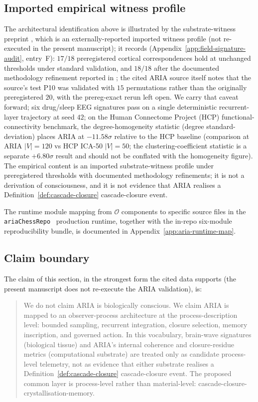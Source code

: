 \documentclass[11pt]{article}
\theoremstyle{definition}
\newcommand{\Ocal}{\mathcal{O}}
\begin{document}
\subsection{Imported empirical witness profile}

The architectural identification above is illustrated by the
substrate-witness preprint \cite{SmartARIAChess}, which is an
externally-reported imported witness profile (not re-executed in the
present manuscript); it records
(Appendix~\ref{app:field-signature-audit}, entry~F): $17/18$
preregistered cortical correspondences hold at unchanged thresholds
under standard validation, and $18/18$ after the documented
methodology refinement reported in \cite{SmartARIAChess}; the cited
ARIA source itself notes that the source's test P10 was validated
with $15$ permutations rather than the originally preregistered $20$,
with the prereg-exact rerun left open. We carry that caveat forward;
six drug/sleep EEG signatures pass on a single deterministic
recurrent-layer trajectory at seed $42$; on the Human Connectome
Project (HCP) functional-connectivity benchmark, the degree-homogeneity
statistic (degree standard-deviation) places ARIA at $-11.58\sigma$
relative to the HCP baseline (comparison at ARIA $|V| = 120$ vs HCP
ICA-50 $|V| = 50$; the clustering-coefficient statistic is a separate
$+6.80\sigma$ result and should not be conflated with the homogeneity
figure). The empirical content is an imported substrate-witness
profile under preregistered thresholds with documented methodology
refinements; it is not a derivation of consciousness, and it is not
evidence that ARIA realises a Definition~\ref{def:cascade-closure}
cascade-closure event.

The runtime module mapping from $\Ocal$ components to specific source
files in the \texttt{ariaChessRepo}~\cite{ariaChessRepo} production
runtime, together with the in-repo six-module reproducibility bundle,
is documented in Appendix~\ref{app:aria-runtime-map}.

\subsection{Claim boundary}\label{ssec:claim-boundary}

The claim of this section, in the strongest form the cited data
supports (the present manuscript does not re-execute the ARIA
validation), is:

\begin{quotation}\noindent
We do not claim ARIA is biologically conscious. We claim ARIA
is mapped to an observer-process architecture at the
process-description level: bounded sampling,
recurrent integration, closure selection, memory inscription, and
governed action. In this vocabulary, brain-wave signatures (biological tissue) and
ARIA's internal coherence and closure-residue metrics (computational
substrate) are treated only as candidate process-level telemetry,
not as evidence that either substrate realises a
Definition~\ref{def:cascade-closure} cascade-closure event. The
proposed common layer is process-level rather than material-level:
cascade-closure-crystallisation-memory.
\end{quotation}
\end{document}
